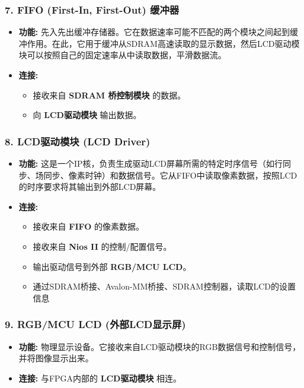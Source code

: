 \documentclass[12pt,hyperref,a4paper,UTF8]{ctexart}
\begin{document}
\subsubsection*{7. FIFO (First-In, First-Out) 缓冲器}
\begin{itemize}
    \item \textbf{功能:} 先入先出缓冲存储器。它在数据速率可能不匹配的两个模块之间起到缓冲作用。在此，它用于缓冲从SDRAM高速读取的显示数据，然后LCD驱动模块可以按照自己的固定速率从中读取数据，平滑数据流。
    \item \textbf{连接:}
    \begin{itemize}
        \item 接收来自 \textbf{SDRAM 桥控制模块} 的数据。
        \item 向 \textbf{LCD驱动模块} 输出数据。
    \end{itemize}
\end{itemize}

\subsubsection*{8. LCD驱动模块 (LCD Driver)}
\begin{itemize}
    \item \textbf{功能:} 这是一个IP核，负责生成驱动LCD屏幕所需的特定时序信号（如行同步、场同步、像素时钟）和数据信号。它从FIFO中读取像素数据，按照LCD的时序要求将其输出到外部LCD屏幕。
    \item \textbf{连接:}
    \begin{itemize}
        \item 接收来自 \textbf{FIFO} 的像素数据。
        \item 接收来自 \textbf{Nios II} 的控制/配置信号。
        \item 输出驱动信号到外部 \textbf{RGB/MCU LCD}。
        \item 通过SDRAM桥接、Avalon-MM桥接、SDRAM控制器，读取LCD的设置信息
    \end{itemize}
\end{itemize}

\subsubsection*{9. RGB/MCU LCD (外部LCD显示屏)}
\begin{itemize}
    \item \textbf{功能:} 物理显示设备。它接收来自LCD驱动模块的RGB数据信号和控制信号，并将图像显示出来。
    \item \textbf{连接:} 与FPGA内部的 \textbf{LCD驱动模块} 相连。
\end{itemize}
\end{document}
